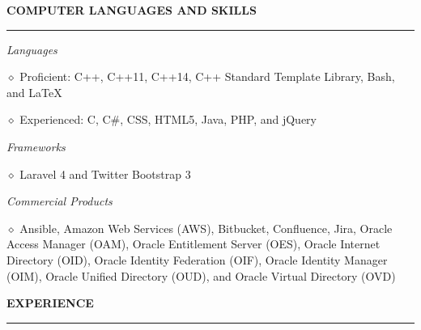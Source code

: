 \documentclass[executivepaper]{extarticle}
\begin{document}
\begin{center}
{\begin{minipage}{7.0in}
\vspace{-1mm}

{}

\vspace{3mm}


{\noindent \textbf{\fontsize{10}{9}\selectfont COMPUTER LANGUAGES AND SKILLS}}

\vspace{-3mm}

\noindent \rule{\textwidth}{0.5pt}

\vspace{-1mm}

{\noindent \textit{\fontsize{9}{8}\selectfont Languages}}

{\noindent $\diamond$ {\fontsize{9}{8}\selectfont Proficient: C++, C++11, C++14, C++ Standard Template Library, Bash, and \LaTeX}}

{\noindent $\diamond$ {\fontsize{9}{8}\selectfont Experienced: C, C\#, CSS, HTML5, Java, PHP, and jQuery}}

{\noindent \textit{\fontsize{9}{8}\selectfont Frameworks}}

{\noindent $\diamond$ {\fontsize{9}{8}\selectfont Laravel 4 and Twitter Bootstrap 3}}

{\noindent \textit{\fontsize{9}{8}\selectfont Commercial Products}}

{\noindent $\diamond$ {\fontsize{9}{8}\selectfont Ansible, Amazon Web Services (AWS), Bitbucket, Confluence, Jira, Oracle Access Manager (OAM), Oracle Entitlement Server (OES), Oracle Internet Directory (OID), Oracle Identity Federation (OIF), Oracle Identity Manager (OIM), Oracle Unified Directory (OUD), and Oracle Virtual Directory (OVD)}}

\vspace{3mm}


{\noindent \textbf{\fontsize{10}{9}\selectfont EXPERIENCE}}

\vspace{-3mm}

\noindent \rule{\textwidth}{0.5pt}


\end{minipage}}
\end{center}
\end{document}
